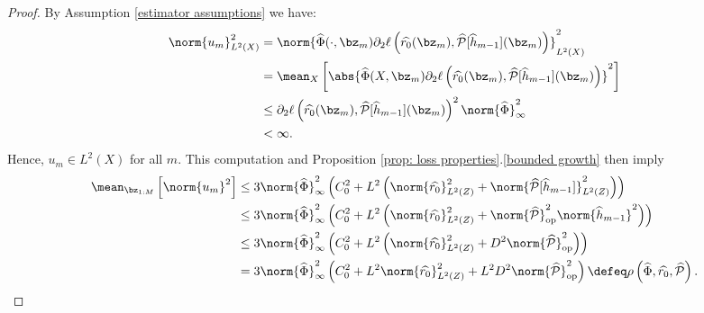 \begin{proof}
    By Assumption \ref{estimator assumptions} we have:
    \begin{align}
        \norm{ u_{ m } }_{ L^{ 2 } ( X ) }^2
        &= \norm{
            \hat{ \Phi } ( \cdot, \bz_{ m } ) \partial_{ 2 } \ell \left(
                \hat{ r_{ 0 } } ( \bz_{ m } ), \hat{ \meanop } [ \hat{ h }_{ m-1 } ] ( \bz_{ m } )
            \right)
        }_{ L^{ 2 } ( X ) }^2 \nonumber \\
        &= \mean_{ X } \left[
            \abs{ 
                \hat{ \Phi } ( X, \bz_{ m } ) \partial_{ 2 } \ell \left(
                    \hat{ r_{ 0 } } ( \bz_{ m } ),
                    \hat{ \meanop } [ \hat{ h }_{ m-1 } ] ( \bz_{ m } )
                \right)
            }^2
        \right] \nonumber \\
        &\leq \partial_{ 2 } \ell \left(
            \hat{ r_{ 0 } } ( \bz_{ m } ),
            \hat{ \meanop } [ \hat{ h }_{ m-1 } ] ( \bz_{ m } )
        \right)^2
        \norm{ \hat{ \Phi } }_{ \infty }^2 \\
        &< \infty \nonumber
    .\end{align}
    Hence, $ u_{ m } \in L^{ 2 } ( X ) $ for all $ m $.
    This computation and Proposition \ref{prop: loss properties}.\ref{bounded growth} then imply
    \begin{align*}
        \mean_{ \bz_{ 1:M } } \left[
            \norm{ u_{ m } }^2
        \right]
        &\leq 3 \norm{ \hat{ \Phi } }^2_{ \infty } 
        \left(
            C_{ 0 }^2 + L^2 \left(
                \norm{ \hat{ r_{ 0 } } }_{ L^2 ( Z ) }^2
                + \norm{ \hat{ \meanop } [ \hat{ h }_{ m-1 } ] }_{ L^2 ( Z ) }^2
            \right)
        \right) \\
        &\leq 3 \norm{ \hat{ \Phi } }^2_{ \infty }
        \left(
            C_{ 0 }^2 + L^2 \left(
                \norm{ \hat{ r_{ 0 } } }_{ L^2 ( Z ) }^2
                + \norm{ \hat{ \meanop } }_{ \op }^2 \norm{ \hat{ h }_{ m-1 } }^2
            \right)
        \right) \\
        &\leq 3 \norm{ \hat{ \Phi } }^2_{ \infty }
        \left(
            C_{ 0 }^2 + L^2 \left(
                \norm{ \hat{ r_{ 0 } } }_{ L^2 ( Z ) }^2
                + D^2 \norm{ \hat{ \meanop } }_{ \op }^2
            \right)
        \right) \\
        &= 3 \norm{ \hat{ \Phi } }^2_{ \infty }
        \left(
            C_{ 0 }^2 + L^2 \norm{ \hat{ r_{ 0 } } }_{ L^2 ( Z ) }^2
                + L^2 D^2 \norm{ \hat{ \meanop } }_{ \op }^2
        \right) \defeq \rho \left( \hat{ \Phi }, \hat{ r_{ 0 } }, \hat{ \meanop } \right) \qedhere.
    \end{align*}
\end{proof}
